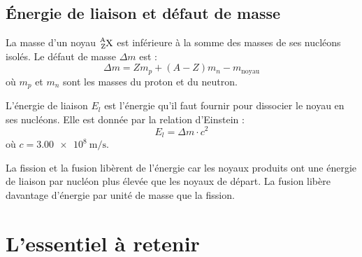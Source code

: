 \subsection{Énergie de liaison et défaut de masse}
\begin{definition}
La masse d'un noyau $\ce{^{A}_{Z}X}$ est inférieure à la somme des masses de ses nucléons isolés. Le défaut de masse $\Delta m$ est :
\[\Delta m = Z m_p + (A-Z) m_n - m_{\text{noyau}}\]
où $m_p$ et $m_n$ sont les masses du proton et du neutron.
\end{definition}

\begin{loi}
L'énergie de liaison $E_l$ est l'énergie qu'il faut fournir pour dissocier le noyau en ses nucléons. Elle est donnée par la relation d'Einstein :
\[E_l = \Delta m \cdot c^2\]
où $c = \SI{3.00e8}{\metre\per\second}$.
\end{loi}

\begin{illus}
\end{illus}

\begin{aretenir}
La fission et la fusion libèrent de l'énergie car les noyaux produits ont une énergie de liaison par nucléon plus élevée que les noyaux de départ. La fusion libère davantage d'énergie par unité de masse que la fission.
\end{aretenir}

\section{L'essentiel à retenir}

